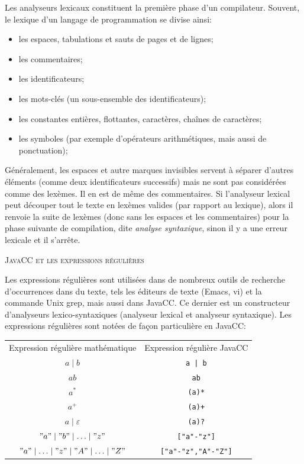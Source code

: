 \documentclass[11pt,a4paper]{article}
\newcommand{\JavaCC}{\textsf{JavaCC}\xspace}
\begin{document}
Les analyseurs lexicaux constituent la première phase d'un
compilateur. Souvent, le lexique d'un langage de programmation se
divise ainsi:

\begin{itemize}

  \item les espaces, tabulations et sauts de pages et de lignes;

  \item les commentaires;

  \item les identificateurs;

  \item les mots-clés (un sous-ensemble des identificateurs);

  \item les constantes entières, flottantes, caractères, chaînes de
        caractères;

  \item les symboles (par exemple d'opérateurs arithmétiques, mais
        aussi de ponctuation);

\end{itemize}

Généralement, les espaces et autre marques invisibles servent à
séparer d'au\-tres éléments (comme deux identificateurs successifs)
mais ne sont pas considérées comme des lexèmes. Il en est de même des
commentaires. Si l'analyseur lexical peut découper tout le texte en
lexèmes valides (par rapport au lexique), alors il renvoie la suite de
lexèmes (donc sans les espaces et les commentaires) pour la phase
suivante de compilation, dite \emph{analyse syntaxique}, sinon il y a
une erreur lexicale et il s'arrête.

\noindent
\textsc{JavaCC et les expressions régulières}

Les expressions régulières sont utilisées dans de nombreux outils de
recherche d'occurrences dans du texte, tels les éditeurs de texte
(\textsf{Emacs}, \textsf{vi}) et la commande Unix \textsf{grep}, mais
aussi dans \JavaCC. Ce dernier est un constructeur
d'analyseurs lexico-syntaxiques (analyseur lexical et analyseur
syntaxique). Les expressions régulières sont notées de façon
particulière en \JavaCC:

\begin{center}
\begin{tabular}{cc}
    Expression régulière mathématique
  & Expression régulière \JavaCC\\
    $a \mid b$
  & \verb+a | b+\\
    $ab$
  & \verb+ab+\\
    $a^{*}$
  & \verb+(a)*+\\
    $a^{+}$
  & \verb|(a)+|\\
    $a \mid \varepsilon$
  & \verb+(a)?+\\
    $"a" \mid "b" \mid \ldots \mid "z"$
  & \verb+["a"-"z"]+\\
    $"a" \mid \ldots \mid "z" \mid "A" \mid \ldots \mid "Z"$
  & \verb+["a"-"z","A"-"Z"]+
\end{tabular}
\end{center}
\end{document}
